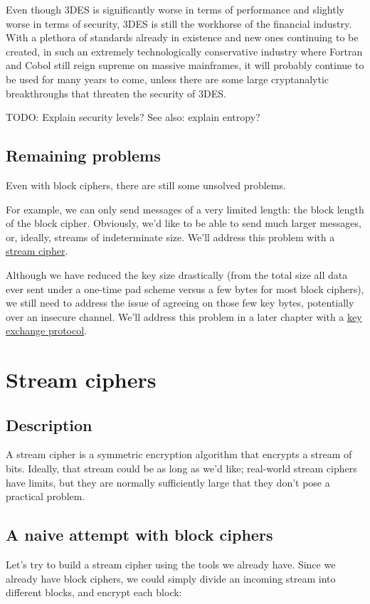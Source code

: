 \documentclass[11pt,ebook,table,dvipsnames]{memoir}
\begin{document}
Even though 3DES is significantly worse in terms of performance and
slightly worse in terms of security, 3DES is still the workhorse of
the financial industry. With a plethora of standards already in
existence and new ones continuing to be created, in such an extremely
technologically conservative industry where Fortran and Cobol still
reign supreme on massive mainframes, it will probably continue to be
used for many years to come, unless there are some large cryptanalytic
breakthroughs that threaten the security of 3DES.

TODO: Explain security levels? See also: explain entropy?
\section{Remaining problems}
\label{sec-2-2-4}
Even with block ciphers, there are still some unsolved problems.

For example, we can only send messages of a very limited length: the
block length of the block cipher. Obviously, we'd like to be able to
send much larger messages, or, ideally, streams of indeterminate size.
We'll address this problem with a \hyperref[sec-2-3]{stream cipher}.

Although we have reduced the key size drastically (from the total size
all data ever sent under a one-time pad scheme versus a few bytes for
most block ciphers), we still need to address the issue of agreeing on
those few key bytes, potentially over an insecure channel. We'll
address this problem in a later chapter with a \hyperref[sec-2-4]{key exchange protocol}.
\chapter{Stream ciphers}
\label{sec-2-3}
\section{Description}
\label{sec-2-3-1}
A stream cipher is a symmetric encryption algorithm that encrypts a
stream of bits. Ideally, that stream could be as long as we'd like;
real-world stream ciphers have limits, but they are normally
sufficiently large that they don't pose a practical problem.
\section{A naive attempt with block ciphers\label{ECB-mode}}
\label{sec-2-3-2}

Let's try to build a stream cipher using the tools we already have.
Since we already have block ciphers, we could simply divide an
incoming stream into different blocks, and encrypt each block:
\end{document}
